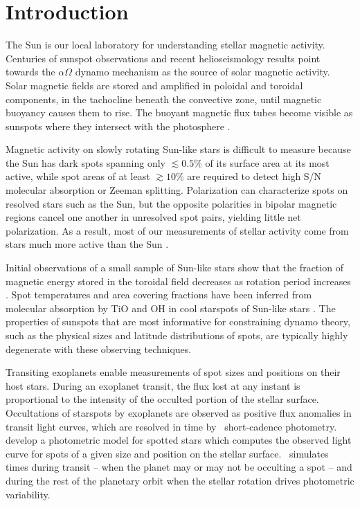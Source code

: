 

\section{Introduction}

The Sun is our local laboratory for understanding stellar magnetic activity. Centuries of sunspot observations and recent helioseismology results point towards the $\alpha\Omega$ dynamo mechanism as the source of solar magnetic activity. Solar magnetic fields are stored and amplified in poloidal and toroidal components, in the tachocline beneath the convective zone, until magnetic buoyancy causes them to rise. The buoyant magnetic flux tubes become visible as sunspots where they intersect with the photosphere \citetext{\citealp{Parker1955a, Parker1955b, Babcock1961}; \citealp[see reviews by][]{Charbonneau2010, Cheung2014, Hathaway2015}}. 

Magnetic activity on slowly rotating Sun-like stars is difficult to measure \citep{Saar1990} because the Sun has dark spots spanning only $\lesssim 0.5\%$ of its surface area at its most active, while spot areas of at least $\gtrsim 10\%$ are required to detect high S/N molecular absorption or Zeeman splitting. Polarization can characterize spots on resolved stars such as the Sun, but the opposite polarities in bipolar magnetic regions cancel one another in unresolved spot pairs, yielding little net polarization. As a result, most of our measurements of stellar activity come from stars much more active than the Sun \citep[see reviews by][]{Berdyugina2005, Reiners2012}.

Initial observations of a small sample of Sun-like stars show that the fraction of magnetic energy stored in the toroidal field decreases as rotation period increases \citep{Petit2008}. Spot temperatures and area covering fractions have been inferred from molecular absorption by TiO and OH in cool starspots of Sun-like stars \citep{Neff1995, ONeal1996, ONeal2001, ONeal2004}.  The properties of sunspots that are most informative for constraining dynamo theory, such as the physical sizes and latitude distributions of spots, are typically highly degenerate with these observing techniques.

Transiting exoplanets enable measurements of spot sizes and positions on their host stars. During an exoplanet transit, the flux lost at any instant is proportional to the intensity of the occulted portion of the stellar surface. Occultations of starspots by exoplanets are observed as positive flux anomalies in transit light curves, which are resolved in time by \kepler\ short-cadence photometry. \cite{Hebb2017} develop a photometric model for spotted stars which computes the observed light curve for spots of a given size and position on the stellar surface. \stsp\ simulates times during transit -- when the planet may or may not be occulting a spot -- and during the rest of the planetary orbit when the stellar rotation drives photometric variability.

